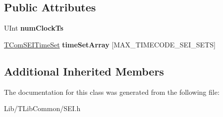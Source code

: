 \subsection*{Public Attributes}
\begin{DoxyCompactItemize}
\item 
\mbox{\label{class_s_e_i_time_code_aeeacb3c130f3e0ec2b098b6008bae336}} 
U\+Int {\bfseries num\+Clock\+Ts}
\item 
\mbox{\label{class_s_e_i_time_code_afc12d99c7e3c8855bb86a18dd4891045}} 
\hyperlink{struct_t_com_s_e_i_time_set}{T\+Com\+S\+E\+I\+Time\+Set} {\bfseries time\+Set\+Array} \mbox{[}M\+A\+X\+\_\+\+T\+I\+M\+E\+C\+O\+D\+E\+\_\+\+S\+E\+I\+\_\+\+S\+E\+TS\mbox{]}
\end{DoxyCompactItemize}
\subsection*{Additional Inherited Members}


The documentation for this class was generated from the following file\+:\begin{DoxyCompactItemize}
\item 
Lib/\+T\+Lib\+Common/S\+E\+I.\+h\end{DoxyCompactItemize}
